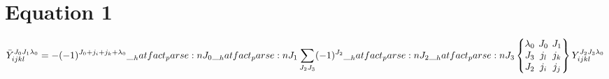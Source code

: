 \documentclass{scrartcl}
\newcommand{\ninej}[9]{\begingroup\setlength{\arraycolsep}{0.2em}\begin{Bmatrix} #1 & #2 & #3 \\ #4 & #5 & #6 \\ #7 & #8 & #9 \end{Bmatrix}\endgroup}
\begin{document}
\section{Equation 1}
\begin{dmath*}
\bar{Y}_{i j k l}^{{J}_{0} {J}_{1} {{\lambda}}_{0}} = -(-1)^{{J}_{0}+{j}_{i}+{j}_{k}+{{\lambda}}_{0}} \* \hatfact{{J}_{0}} \* \hatfact{{J}_{1}} \* \sum_{{J}_{2} {J}_{3}} \* (-1)^{{J}_{2}} \* \hatfact{{J}_{2}} \* \hatfact{{J}_{3}} \* \ninej{{{\lambda}}_{0}}{{J}_{0}}{{J}_{1}}{{J}_{3}}{{j}_{l}}{{j}_{k}}{{J}_{2}}{{j}_{i}}{{j}_{j}} \* Y_{i j k l}^{{J}_{2} {J}_{3} {{\lambda}}_{0}}
\end{dmath*}
\end{document}
